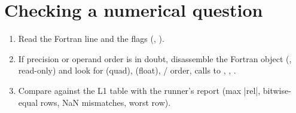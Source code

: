 \section{\texorpdfstring{Checking a numerical question}{Checking a numerical question}}\label{translation_report-04u5fnumerics:47-checking-a-numerical-question}
\begin{enumerate}
\item Read the Fortran line and the flags (, ).
\item If precision or operand order is in doubt, disassemble the Fortran object (, read-only) and look for  (quad),  (float),
/ order, calls to , , .
\item Compare against the L1 table with the runner's report (max |rel|, bitwise-equal rows, NaN mismatches, worst row).
\end{enumerate}
